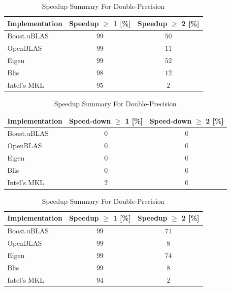 \begin{table}[ht]
    \centering
    \caption{Speedup Summary For Single-Precision}
    \begin{tabular}{|l|c|c|}
        \hline
        \textbf{Implementation} & \textbf{Speedup $\geq$ 1 [\%]} & \textbf{Speedup $\geq$ 2 [\%]}\\
        \hline
        Boost.uBLAS & $99$ & $50$ \\
        \hline
        OpenBLAS    & $99$ & $11$ \\
        \hline
        Eigen       & $99$ & $52$ \\
        \hline
        Blis        & $98$ & $12$ \\
        \hline
        Intel's MKL & $95$ & $2$ \\
        \hline
    \end{tabular}
    
    \begin{tabular}{|l|c|c|}
        \hline
        \textbf{Implementation} & \textbf{Speed-down $\geq$ 1 [\%]} & \textbf{Speed-down $\geq$ 2 [\%]}\\
        \hline
        Boost.uBLAS & $0$ & $0$ \\
        \hline
        OpenBLAS    & $0$ & $0$ \\
        \hline
        Eigen       & $0$ & $0$ \\
        \hline
        Blis        & $0$ & $0$ \\
        \hline
        Intel's MKL & $2$ & $0$ \\
        \hline
    \end{tabular}
    
    \vspace*{1 cm}

    \centering
    \caption{Speedup Summary For Double-Precision}
    \begin{tabular}{|l|c|c|}
        \hline
        \textbf{Implementation} & \textbf{Speedup $\geq$ 1 [\%]} & \textbf{Speedup $\geq$ 2 [\%]}\\
        \hline
        Boost.uBLAS & $99$ & $71$ \\
        \hline
        OpenBLAS    & $99$ & $8$ \\
        \hline
        Eigen       & $99$ & $74$ \\
        \hline
        Blis        & $99$ & $8$ \\
        \hline
        Intel's MKL & $94$ & $2$ \\
        \hline
    \end{tabular}
    

\end{table}
